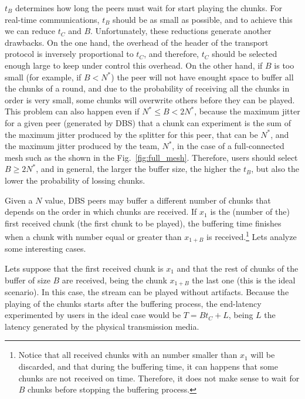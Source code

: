 

\label{sec:buffering_time}

$t_B$ determines how long the peers must wait for start playing the
chunks. For real-time communications, $t_B$ should be as small as
possible, and to achieve this we can reduce $t_C$ and
$B$. Unfortunately, these reductions generate another drawbacks. On
the one hand, the overhead of the header of the transport protocol is
inversely proportional to $t_C$, and therefore, $t_C$ should be
selected enough large to keep under control this overhead. On the
other hand, if $B$ is too small (for example, if $B<N^*$) the peer
will not have enought space to buffer all the chunks of a round, and
due to the probability of receiving all the chunks in order is very
small, some chunks will overwrite others before they can be
played. This problem can also happen even if $N^*\leq B<2N^*$, because
the maximum jitter for a given peer (generated by DBS) that a chunk
can experiment is the sum of the maximum jitter produced by the
splitter for this peer, that can be $N^*$, and the maximum jitter
produced by the team, $N^*$, in the case of a full-connected mesh such
as the shown in the Fig.~\ref{fig:full_mesh}. Therefore, users should
select $B\ge 2N^*$, and in general, the larger the buffer size, the
higher the $t_B$, but also the lower the probability of lossing
chunks.

Given a $N$ value, DBS peers may buffer a different number of chunks
that depends on the order in which chunks are received. If $x_1$ is
the (number of the) first received chunk (the first chunk to be
played), the buffering time finishes when a chunk with number equal or
greater than $x_{1+B}$ is received.\footnote{Notice that all received
  chunks with an number smaller than $x_1$ will be discarded, and that
  during the buffering time, it can happens that some chunks are not
  received on time. Therefore, it does not make sense to wait for $B$
  chunks before stopping the buffering process.} Lets analyze some
interesting cases.

Lets suppose that the first received chunk is $x_1$ and that the rest
of chunks of the buffer of size $B$ are received, being the chunk
$x_{1+B}$ the last one (this is the ideal scenario). In this case, the
stream can be played without artifacts. Because the playing of the
chunks starts after the buffering process, the end-latency
experimented by users in the ideal case would be $T=Bt_C+L$, being $L$
the latency generated by the physical transmission media.

